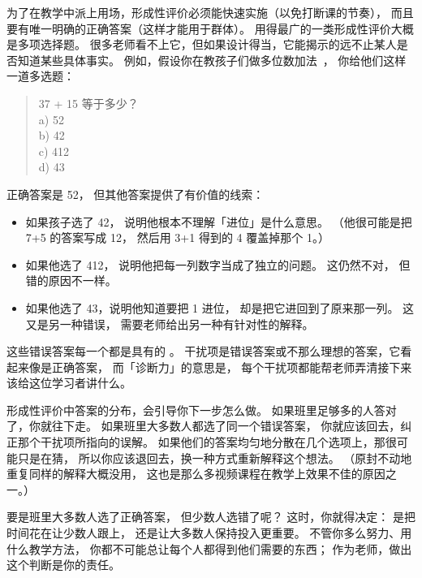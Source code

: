 为了在教学中派上用场，形成性评价必须能快速实施（以免打断课的节奏），
而且要有唯一明确的正确答案（这样才能用于群体）。
用得最广的一类形成性评价大概是多项选择题。
很多老师看不上它，但如果设计得当，它能揭示的远不止某人是否知道某些具体事实。
例如，假设你在教孩子们做多位数加法~\cite{Ojos2015}，
你给他们这样一道多选题：

\begin{quote}
  37 + 15 等于多少？\\
  a) 52\\
  b) 42\\
  c) 412\\
  d) 43
\end{quote}

\noindent
正确答案是 52，
但其他答案提供了有价值的线索：

\begin{itemize}

\item
  如果孩子选了 42，
  说明他根本不理解「进位」是什么意思。
  （他很可能是把 7+5 的答案写成 12，
  然后用 3+1 得到的 4 覆盖掉那个 1。）

\item
  如果他选了 412，
  说明他把每一列数字当成了独立的问题。
  这仍然不对，
  但错的原因不一样。

\item
  如果他选了 43，说明他知道要把 1 进位，
  却是把它进回到了原来那一列。
  这又是另一种错误，
  需要老师给出另一种有针对性的解释。

\end{itemize}

这些错误答案每一个都是具有的
。
干扰项是错误答案或不那么理想的答案，它看起来像是正确答案，
而「诊断力」的意思是，
每个干扰项都能帮老师弄清接下来该给这位学习者讲什么。

形成性评价中答案的分布，会引导你下一步怎么做。
如果班里足够多的人答对了，你就往下走。
如果班里大多数人都选了同一个错误答案，
你就应该回去，纠正那个干扰项所指向的误解。
如果他们的答案均匀地分散在几个选项上，那很可能只是在猜，
所以你应该退回去，换一种方式重新解释这个想法。
（原封不动地重复同样的解释大概没用，
这也是那么多视频课程在教学上效果不佳的原因之一。）

要是班里大多数人选了正确答案，
但少数人选错了呢？
这时，你就得决定：
是把时间花在让少数人跟上，
还是让大多数人保持投入更重要。
不管你多么努力、用什么教学方法，
你都不可能总让每个人都得到他们需要的东西；
作为老师，做出这个判断是你的责任。

